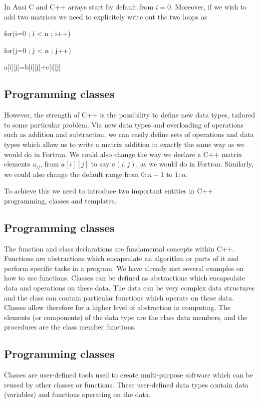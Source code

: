 \documentclass[%
twoside,                 %
final,                   %
10pt]{article}
\begin{document}
{{{{{In Ansi C and C++ arrays start by default from $i=0$.  Moreover, if we  wish to add two matrices we need to explicitely write out
the two loops as

\bcppcod
   for(i=0 ; i < n ; i++) {
      for(j=0 ; j < n ; j++) {
         a[i][j]=b[i][j]+c[i][j]

\ecppcod

\subsection{Programming classes}

However,
the strength of C++ is the possibility
to define new data types, tailored to some particular problem.
Via new data types and overloading of operations such as addition and subtraction, we can easily define
sets of operations and data types which allow us to write a matrix addition in exactly the same
way as we would do in Fortran.  We could also change the way we declare a C++ matrix elements $a_{ij}$, from  $a[i][j]$
to say $a(i,j)$, as we would do in Fortran. Similarly, we could also change the default range from $0:n-1$ to $1:n$.

To achieve this we need to introduce two important entities in C++ programming, classes and templates.

\subsection{Programming classes}

The function and class declarations are fundamental concepts within C++.  Functions are abstractions
which encapsulate an algorithm or parts of it and perform specific tasks in a program.
We have already met several examples on how to use  functions.
Classes can be defined as abstractions which encapsulate
data and operations on these data.
The data can be very complex data structures  and the class can contain particular functions
which operate on these data. Classes allow therefore for a higher level of abstraction in computing.
The elements (or components) of the data
type are the class data members, and the procedures are the class
member functions.

\subsection{Programming classes}

Classes are user-defined tools used to create multi-purpose software which can be reused by other classes or functions.
These user-defined data types contain data (variables) and
functions operating on the data.

}}}}}}}
\end{document}
